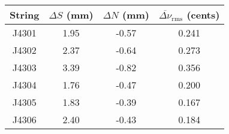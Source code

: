 \begin{tabular}{cccc}
\toprule
String & $\Delta S$ (mm) & $\Delta N$ (mm) & $\overline{\Delta \nu}_\text{rms}$ (cents) \\
\midrule
J4301 & 1.95 & -0.57 & 0.241 \\
J4302 & 2.37 & -0.64 & 0.273 \\
J4303 & 3.39 & -0.82 & 0.356 \\
J4304 & 1.76 & -0.47 & 0.200 \\
J4305 & 1.83 & -0.39 & 0.167 \\
J4306 & 2.40 & -0.43 & 0.184 \\
\bottomrule
\end{tabular}
